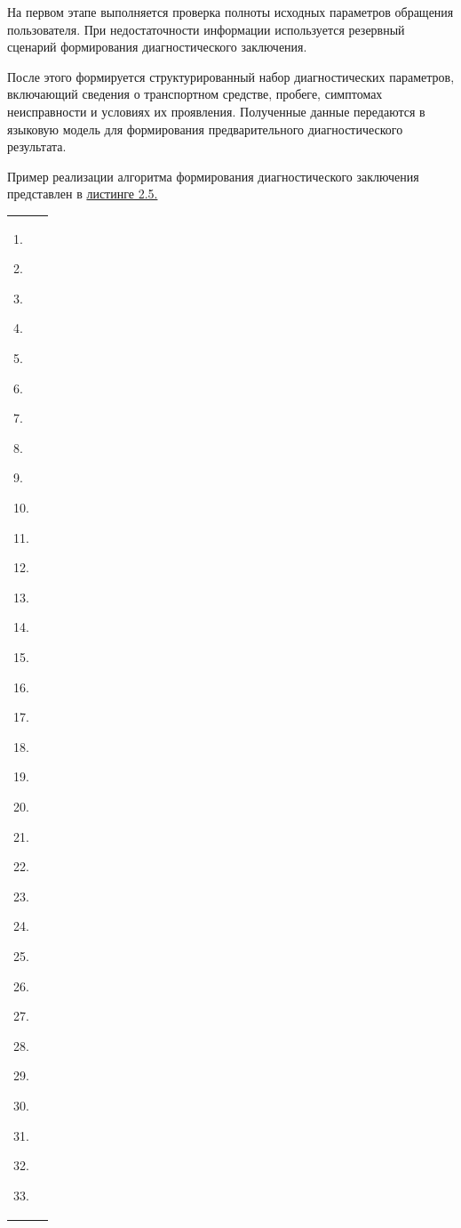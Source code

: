 \documentclass[14pt,a4paper]{extarticle}
\newcounter{none}
\numberwithin{figure}{section}
\numberwithin{table}{section}
\begin{document}
На первом этапе выполняется проверка полноты исходных параметров
обращения пользователя. При недостаточности информации используется
резервный сценарий формирования диагностического заключения.

После этого формируется структурированный набор диагностических
параметров, включающий сведения о транспортном средстве, пробеге,
симптомах неисправности и условиях их проявления. Полученные данные
передаются в языковую модель для формирования предварительного
диагностического результата.

Пример реализации алгоритма формирования диагностического заключения
представлен в
\protect{}\label{ux43bux438ux44125}{}\hyperref[ux43bux438ux441251]{листинге
2.5.}

{\def\LTcaptype{none} %
\begin{longtable}[]{@{}
  >{\raggedright\arraybackslash}p{}
  >{\raggedright\arraybackslash}p{}@{}}
\toprule\noalign{}
\begin{minipage}[b]{\linewidth}\raggedright
1.

2.

3.

4.

5.

6.

7.

8.

9.

10.

11.

12.

13.

14.

15.

16.

17.

18.

19.

20.

21.

22.

23.

24.

25.

26.

27.

28.

29.

30.

31.

32.

33.


\end{minipage}
\end{longtable}}
\end{document}

